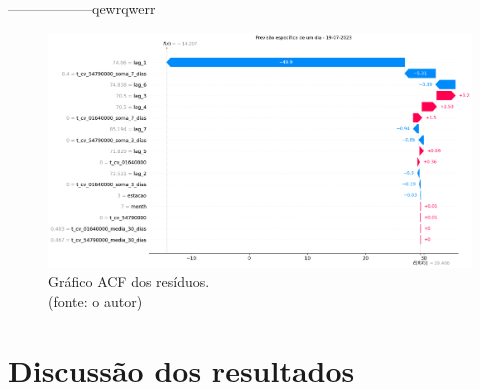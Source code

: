 %

%

------------------qewrqwerr

\begin{figure}[!h]
\centering
\includegraphics[scale=0.33]{Figuras/jequiti/wfv/feature_importance/feature_importance_cb_previsao200.png}
\caption{Gráfico ACF dos resíduos.\\(fonte: o autor)}
\label{fig:jequiti_feature_importance_cb_previsao200}
\end{figure}

\section{Discuss\~ao dos resultados}
